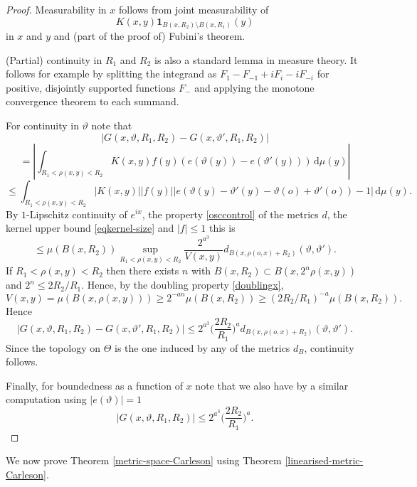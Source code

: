 \documentclass[10pt,a4paper]{article}
\theoremstyle{plain}
\theoremstyle{definition}
\numberwithin{equation}{subsection}
\newcommand{\mfa}{{\vartheta}}
\newcommand{\Mf}{{\Theta}}
\newcommand{\leanok}{}
\begin{document}
\begin{proof}
    \leanok
    Measurability in $x$ follows from joint measurability of
    \[
        K(x,y) \mathbf{1}_{B(x,R_2) \setminus B(x,R_1)}(y)
    \]
    in $x$ and $y$ and (part of the proof of) Fubini's theorem.

    (Partial) continuity in $R_1$ and $R_2$ is also a standard lemma in measure theory. It follows for example by splitting the integrand as $F_1 - F_{-1} + iF_i - iF_{-i}$ for positive, disjointly supported functions $F_{-}$ and applying the monotone convergence theorem to each summand.

    For continuity in $\mfa$ note that
    \[
        |G(x, \mfa, R_1, R_2) - G(x, \mfa', R_1, R_2)|
    \]
    \[
        = \left| \int_{R_1 < \rho(x,y) < R_2} K(x,y) f(y) (e(\mfa(y)) - e(\mfa'(y))) \, \mathrm{d}\mu(y) \right|
    \]
    \[
        \le \int_{R_1 < \rho(x,y) < R_2} |K(x,y)| |f(y)| |e(\mfa(y) - \mfa'(y) - \mfa(o) + \mfa'(o)) - 1| \, \mathrm{d}\mu(y).
    \]
    By $1$-Lipschitz continuity of $e^{ix}$, the property \eqref{osccontrol} of the metrics $d$, the kernel upper bound \eqref{eqkernel-size} and $|f| \le 1$ this is
    \[
        \le \mu(B(x, R_2)) \sup_{R_1 < \rho(x,y) < R_2} \frac{2^{a^3}}{V(x,y)} d_{B(x,\rho(o,x)+R_2)}(\vartheta, \vartheta').
    \]
    If $R_1 < \rho(x,y) < R_2$ then there exists $n$ with $B(x,R_2) \subset B(x, 2^n \rho(x,y))$ and $2^n \le 2 R_2/R_1$. Hence, by the doubling property \eqref{doublingx},
    \[
        V(x,y) = \mu(B(x, \rho(x,y))) \ge 2^{-an} \mu(B(x, R_2)) \ge (2R_2 / R_1)^{-a} \mu(B(x, R_2)).
    \]
    Hence
    \[
        |G(x, \mfa, R_1, R_2) - G(x, \mfa', R_1, R_2)| \le 2^{a^3} \Big(\frac{2R_2}{R_1}\Big)^a d_{B(x, \rho(o,x)+R_2)}(\mfa, \mfa').
    \]
    Since the topology on $\Mf$ is the one induced by any of the metrics $d_B$, continuity follows.

    Finally, for boundedness as a function of $x$ note that we also have by a similar computation using $|e(\mfa)|=1$
    \[
        |G(x, \mfa, R_1, R_2)| \le 2^{a^3} \Big(\frac{2R_2}{R_1}\Big)^a.
    \]
\end{proof}

We now prove Theorem \ref{metric-space-Carleson} using Theorem \ref{linearised-metric-Carleson}.
\end{document}

